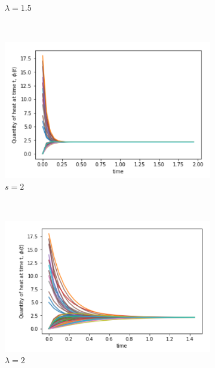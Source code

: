 \documentclass[10pt,a4paper]{article}
\begin{document}
\begin{figure}[H]
\begin{subfigure}[b]{0.45\textwidth}
        		\caption{$\lambda = 1.5$}
        	\end{subfigure}\\
        	\begin{subfigure}[b]{0.45\textwidth}
        		\includegraphics[width= \textwidth]{images/Erdos-Mellin2.png}
        		\caption{$s=2$}
        	\end{subfigure}~
        	\begin{subfigure}[b]{0.45\textwidth}
        		\includegraphics[width= \textwidth]{images/Erdos-Laplace2.png}
        		\caption{$\lambda = 2$}
        	\end{subfigure}\\
        	\begin{subfigure}[b]{0.45\textwidth}

\end{subfigure}
\end{figure}
\end{document}
